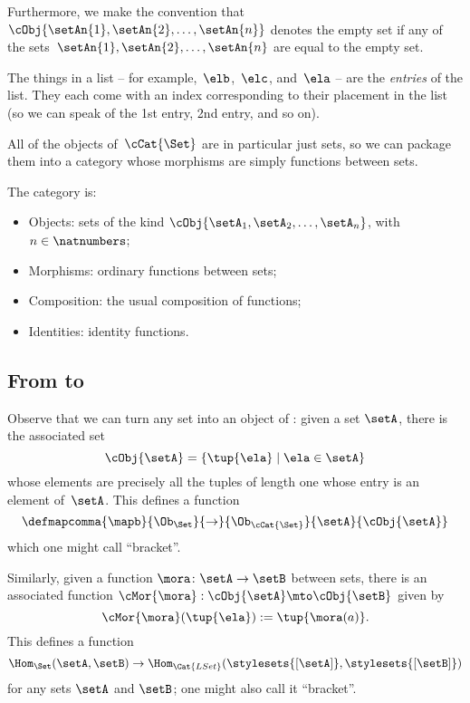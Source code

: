 Furthermore, we make the convention that~$\cObj{\setAn{1}, \setAn{2}, \dots, \setAn{n}}$ denotes the empty set if any of the sets~$\setAn{1}, \setAn{2}, \dots , \setAn{n}$ are equal to the empty set.

The things in a list -- for example,~$\elb$,~$\elc$, and~$\ela$ -- are the \emph{entries} of the list.
They each come with an index corresponding to their placement in the list (so we can speak of the 1st entry, 2nd entry, and so on).

All of the objects of~$\cCat{\Set}$ are in particular just sets, so we can package them into a category whose morphisms are simply functions between sets.

\begin{ctdefinition}[\cCat{\Set}]
    The category \cCat{\Set} is:

    \begin{itemize}
        \item Objects: sets of the kind $\cObj{\setA_1, \setA_2, \dots, \setA_n}$, with $n \in \natnumbers$;
        \item Morphisms: ordinary functions between sets;
        \item Composition: the usual composition of functions;
        \item Identities: identity functions.
    \end{itemize}
\end{ctdefinition}

\subsection{From \Set to \cCat{\Set}}

Observe that we can turn any set into an object of \cCat{\Set}: given a set $\setA$, there is the associated set
\begin{equation*}
    \cObj{\setA} = \{ \tup{\ela} \mid \ela \in \setA \}
\end{equation*}
whose elements are precisely all the tuples of length one whose entry is an element of~$\setA$.
This defines a function
\begin{equation*}
    \defmapcomma{\mapb}{\Ob_{\Set}}
    {\to}
    {\Ob_{\cCat{\Set}}}
    {\setA }
    {\cObj{\setA}}
\end{equation*}
which one might call ``bracket''.

Similarly, given a function $\mora \colon \setA \to \setB$ between sets, there is an associated function $\cMor{ \mora }: \cObj{\setA} \mto \cObj{\setB}$ given by
\begin{equation}
    \cMor{ \mora } ( \tup{ \ela }) := \tup{\mora(a)}.
\end{equation}
This defines a function
\begin{equation}
    \Hom_{\Set}(\setA,\setB) \to \Hom_{\Cat{LSet}}(\stylesets{[\setA]},\stylesets{[\setB]})
\end{equation}
for any sets $\setA$ and $\setB$; one might also call it ``bracket''.


